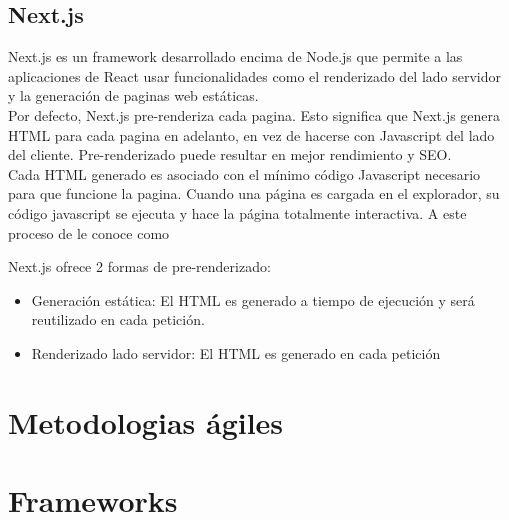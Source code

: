     \subsection{Next.js}

        Next.js es un framework desarrollado encima de Node.js que permite a las aplicaciones de React usar funcionalidades como el renderizado del lado servidor y la generación de paginas web estáticas.\\

        Por defecto, Next.js pre-renderiza cada pagina. Esto significa que Next.js genera HTML para cada pagina en adelanto, en vez de hacerse con Javascript del lado del cliente. Pre-renderizado puede resultar en mejor rendimiento y SEO.\\

        Cada HTML generado es asociado con el mínimo código Javascript necesario para que funcione la pagina. Cuando una página es cargada en el explorador, su código javascript se ejecuta y hace la página totalmente interactiva. A este proceso de le conoce como 

        Next.js ofrece 2 formas de pre-renderizado: 

        \begin{itemize}
            \item Generación estática: El HTML es generado a tiempo de ejecución y será reutilizado en cada petición.
            \item Renderizado lado servidor: El HTML es generado en cada petición
        \end{itemize}




\section{Metodologias ágiles}

    \section{Frameworks}

